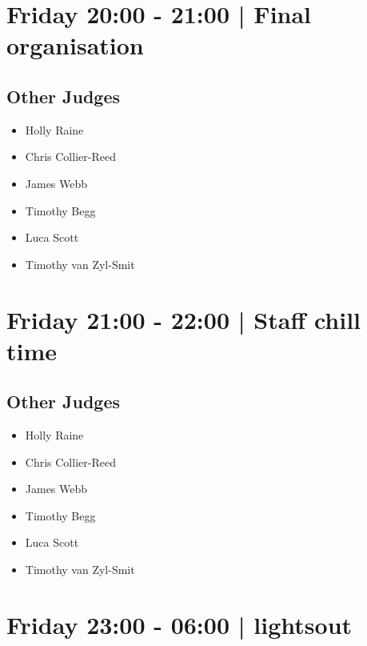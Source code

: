 \documentclass[10pt, A5]{article}
\begin{document}
            \section*{Friday 20:00
        -
        21:00
        |
         Final organisation}
        
                
        \subsection*{Other Judges}
        
            \begin{itemize}
                            \item Holly Raine
                            \item Chris Collier-Reed
                            \item James Webb
                            \item Timothy Begg
                            \item Luca Scott
                            \item Timothy van Zyl-Smit
                        \end{itemize}
        

            \section*{Friday 21:00
        -
        22:00
        |
         Staff chill time}
        
                
        \subsection*{Other Judges}
        
            \begin{itemize}
                            \item Holly Raine
                            \item Chris Collier-Reed
                            \item James Webb
                            \item Timothy Begg
                            \item Luca Scott
                            \item Timothy van Zyl-Smit
                        \end{itemize}
        

            \section*{Friday 23:00
        -
        06:00
        |
         lightsout}
        
\end{document}
